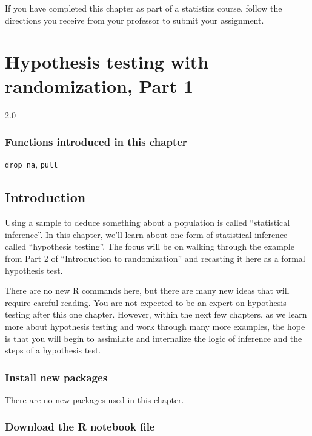 \documentclass[
]{book}
\begin{document}
If you have completed this chapter as part of a statistics course, follow the directions you receive from your professor to submit your assignment.

\hypertarget{hypothesis1}{%
\chapter{Hypothesis testing with randomization, Part 1}\label{hypothesis1}}

2.0

\hypertarget{functions-introduced-in-this-chapter-9}{%
\subsection*{Functions introduced in this chapter}\label{functions-introduced-in-this-chapter-9}}

\texttt{drop\_na}, \texttt{pull}

\hypertarget{hypothesis1-intro}{%
\section{Introduction}\label{hypothesis1-intro}}

Using a sample to deduce something about a population is called ``statistical inference''. In this chapter, we'll learn about one form of statistical inference called ``hypothesis testing''. The focus will be on walking through the example from Part 2 of ``Introduction to randomization'' and recasting it here as a formal hypothesis test.

There are no new R commands here, but there are many new ideas that will require careful reading. You are not expected to be an expert on hypothesis testing after this one chapter. However, within the next few chapters, as we learn more about hypothesis testing and work through many more examples, the hope is that you will begin to assimilate and internalize the logic of inference and the steps of a hypothesis test.

\hypertarget{hypothesis1-install}{%
\subsection{Install new packages}\label{hypothesis1-install}}

There are no new packages used in this chapter.

\hypertarget{hypothesis1-download}{%
\subsection{Download the R notebook file}\label{hypothesis1-download}}
\end{document}

